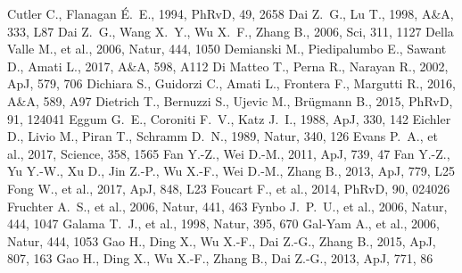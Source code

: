 \documentclass[a4paper,fleqn,usenatbib]{mnras}
\begin{document}
\begin{thebibliography}{207}
 Cutler C., Flanagan {\'E}.~E., 1994, PhRvD, 49, 2658
 Dai Z.~G., Lu T., 1998, A\&A, 333, L87
 Dai Z.~G., Wang X.~Y., Wu X.~F., Zhang B., 2006, Sci, 311, 1127
 Della Valle M., et al., 2006, Natur, 444, 1050
 Demianski M., Piedipalumbo E., Sawant D., Amati L., 2017, A\&A, 598, A112
 Di Matteo T., Perna R., Narayan R., 2002, ApJ, 579, 706
 Dichiara S., Guidorzi C., Amati L., Frontera F., Margutti R., 2016, A\&A, 589, A97
 Dietrich T., Bernuzzi S., Ujevic M., Br{\"u}gmann B., 2015, PhRvD, 91, 124041
 Eggum G.~E., Coroniti F.~V., Katz J.~I., 1988, ApJ, 330, 142
 Eichler D., Livio M., Piran T., Schramm D.~N., 1989, Natur, 340, 126
 Evans P.~A., et al., 2017, Science, 358, 1565 
 Fan Y.-Z., Wei D.-M., 2011, ApJ, 739, 47
 Fan Y.-Z., Yu Y.-W., Xu D., Jin Z.-P., Wu X.-F., Wei D.-M., Zhang B., 2013, ApJ, 779, L25
 Fong W., et al., 2017, ApJ, 848, L23
 Foucart F., et al., 2014, PhRvD, 90, 024026
 Fruchter A.~S., et al., 2006, Natur, 441, 463
 Fynbo J.~P.~U., et al., 2006, Natur, 444, 1047
 Galama T.~J., et al., 1998, Natur, 395, 670
 Gal-Yam A., et al., 2006, Natur, 444, 1053
 Gao H., Ding X., Wu X.-F., Dai Z.-G., Zhang B., 2015, ApJ, 807, 163
 Gao H., Ding X., Wu X.-F., Zhang B., Dai Z.-G., 2013, ApJ, 771, 86

\end{thebibliography}
\end{document}
